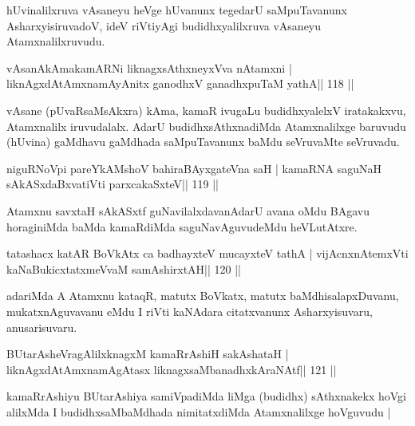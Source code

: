\begin{artha}
hUvinalilxruva vAsaneyu heVge hUvanunx tegedarU saMpuTavanunx  AsharxyisiruvadoV, ideV riVtiyAgi budidhxyalilxruva vAsaneyu Atamxnalilxruvudu.
\end{artha}

\begin{shl}
vAsanAkAmakamARNi liknagxsAthxneyxVva nA\s\s tamxni |
liknAgxdAtAmxnamAyAnitx ganodhxV ganadhxpuTaM yathA\hfill || 118 ||
\end{shl}

\begin{artha}
vAsane (pUvaRsaMsAkxra) kAma, kamaR ivugaLu budidhxyalelxV iratakakxvu, Atamxnalilx iruvudalalx. AdarU budidhxsAthxnadiMda Atamxnalilxge baruvudu (hUvina) gaMdhavu gaMdhada saMpuTavanunx baMdu seVruvaMte seVruvadu.
\end{artha}


\begin{shl}
niguRNoV\s pi pareYkAMshoV bahiraBAyxgateVna saH |
kamaRNA saguNaH sAkASxdaBxvatiVti parxcakaSxteV\hfill || 119 ||
\end{shl}

\begin{artha}
Atamxnu savxtaH sAkASxtf guNavilalxdavanAdarU avana oMdu BAgavu
horaginiMda baMda kamaRdiMda saguNavAguvudeMdu heVLutAtxre.
\end{artha}

\begin{shl}
tatashacx katAR BoVkAtx ca badhayxteV mucayxteV tathA |
vijAcnxnAtemxVti kaNaBukicxtatxmeVvaM samAshirxtAH\hfill || 120 ||
\end{shl}

\begin{artha}
adariMda A Atamxnu kataqR, matutx BoVkatx, matutx baMdhisalapxDuvanu, mukatxnAguvavanu eMdu I riVti kaNAdara citatxvanunx Asharxyisuvaru, anusarisuvaru.
\end{artha}

\begin{shl}
BUtarAsheVragAlilxknagxM kamaRrAshiH sakAshataH |
liknAgxdAtAmxnamAgAtasx liknagxsaMbanadhxkAraNAtf\hfill || 121 ||
\end{shl}

\begin{artha}
kamaRrAshiyu BUtarAshiya samiVpadiMda liMga (budidhx) sAthxnakekx hoVgi
alilxMda I budidhxsaMbaMdhada nimitatxdiMda Atamxnalilxge  hoVguvudu |
\end{artha}

